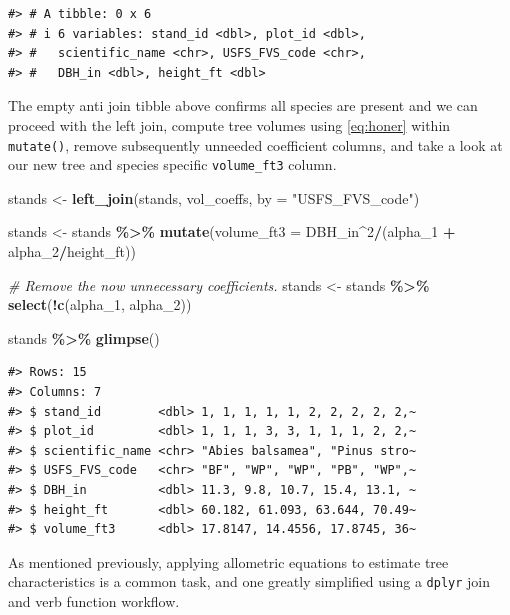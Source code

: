 \documentclass[
  11pt,
]{krantz}
\newenvironment{Shaded}{\begin{snugshade}}{\end{snugshade}}
\newcommand{\CommentTok}[1]{\textcolor[rgb]{0.56,0.35,0.01}{\textit{#1}}}
\newcommand{\DataTypeTok}[1]{\textcolor[rgb]{0.13,0.29,0.53}{#1}}
\newcommand{\DecValTok}[1]{\textcolor[rgb]{0.00,0.00,0.81}{#1}}
\newcommand{\KeywordTok}[1]{\textcolor[rgb]{0.13,0.29,0.53}{\textbf{#1}}}
\newcommand{\NormalTok}[1]{#1}
\newcommand{\OperatorTok}[1]{\textcolor[rgb]{0.81,0.36,0.00}{\textbf{#1}}}
\newcommand{\StringTok}[1]{\textcolor[rgb]{0.31,0.60,0.02}{#1}}
\theoremstyle{definition}
\theoremstyle{definition}
\theoremstyle{definition}
\theoremstyle{definition}
\theoremstyle{remark}
\begin{document}
\begin{verbatim}
#> # A tibble: 0 x 6
#> # i 6 variables: stand_id <dbl>, plot_id <dbl>,
#> #   scientific_name <chr>, USFS_FVS_code <chr>,
#> #   DBH_in <dbl>, height_ft <dbl>
\end{verbatim}

The empty anti join tibble above confirms all species are present and we can proceed with the left join, compute tree volumes using \eqref{eq:honer} within \texttt{mutate()}, remove subsequently unneeded coefficient columns, and take a look at our new tree and species specific \texttt{volume\_ft3} column.

\begin{Shaded}
\begin{Highlighting}[]
\NormalTok{stands \textless{}{-}}\StringTok{ }\KeywordTok{left\_join}\NormalTok{(stands, vol\_coeffs, }\DataTypeTok{by =} \StringTok{"USFS\_FVS\_code"}\NormalTok{)}

\NormalTok{stands \textless{}{-}}\StringTok{ }\NormalTok{stands }\OperatorTok{\%\textgreater{}\%}\StringTok{ }
\StringTok{  }\KeywordTok{mutate}\NormalTok{(}\DataTypeTok{volume\_ft3 =}\NormalTok{ DBH\_in}\OperatorTok{\^{}}\DecValTok{2}\OperatorTok{/}\NormalTok{(alpha\_}\DecValTok{1} \OperatorTok{+}\StringTok{ }\NormalTok{alpha\_}\DecValTok{2}\OperatorTok{/}\NormalTok{height\_ft))}

\CommentTok{\# Remove the now unnecessary coefficients.}
\NormalTok{stands \textless{}{-}}\StringTok{ }\NormalTok{stands }\OperatorTok{\%\textgreater{}\%}\StringTok{ }\KeywordTok{select}\NormalTok{(}\OperatorTok{!}\KeywordTok{c}\NormalTok{(alpha\_}\DecValTok{1}\NormalTok{, alpha\_}\DecValTok{2}\NormalTok{))}

\NormalTok{stands }\OperatorTok{\%\textgreater{}\%}\StringTok{ }\KeywordTok{glimpse}\NormalTok{()}
\end{Highlighting}
\end{Shaded}

\begin{verbatim}
#> Rows: 15
#> Columns: 7
#> $ stand_id        <dbl> 1, 1, 1, 1, 1, 2, 2, 2, 2, 2,~
#> $ plot_id         <dbl> 1, 1, 1, 3, 3, 1, 1, 1, 2, 2,~
#> $ scientific_name <chr> "Abies balsamea", "Pinus stro~
#> $ USFS_FVS_code   <chr> "BF", "WP", "WP", "PB", "WP",~
#> $ DBH_in          <dbl> 11.3, 9.8, 10.7, 15.4, 13.1, ~
#> $ height_ft       <dbl> 60.182, 61.093, 63.644, 70.49~
#> $ volume_ft3      <dbl> 17.8147, 14.4556, 17.8745, 36~
\end{verbatim}

As mentioned previously, applying allometric equations to estimate tree characteristics is a common task, and one greatly simplified using a \texttt{dplyr} join and verb function workflow.
\end{document}
